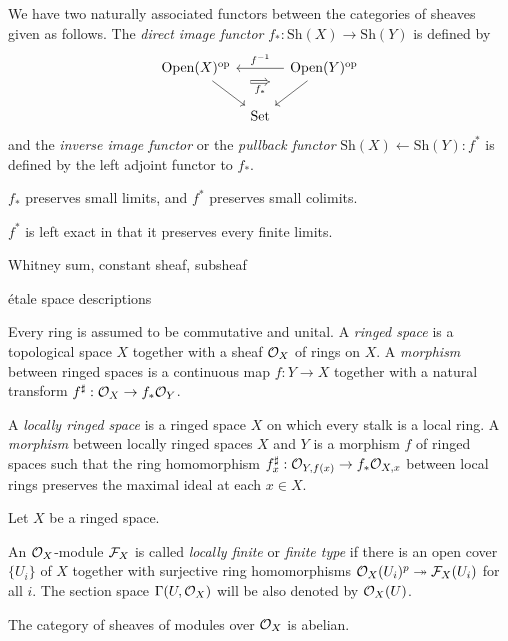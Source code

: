 \documentclass{../../large}
\newcommand{\Sh}{\mathrm{Sh}}
\newcommand{\Open}{\mathrm{Open}}
\begin{document}
\begin{prb}
We have two naturally associated functors between the categories of sheaves given as follows.
The \emph{direct image functor} $f_*:\Sh(X)\to\Sh(Y)$ is defined by
\[\begin{tikzcd}[column sep=tiny]
\Open(X)^\op \ar{dr}
\ar[Rightarrow, shorten >=10, shorten <=10, shift right=4, swap]{rr}{f_*}
&& \Open(Y)^\op \ar[swap]{ll}{f^{-1}}\ar{dl}\\
&\mathrm{Set}
\end{tikzcd}\]
and the \emph{inverse image functor} or the \emph{pullback functor} $\Sh(X)\leftarrow\Sh(Y):f^*$ is defined by the left adjoint functor to $f_*$.

\begin{parts}
\item $f_*$ preserves small limits, and $f^*$ preserves small colimits.
\item $f^*$ is left exact in that it preserves every finite limits.
\end{parts}
\end{prb}


\begin{prb}
Whitney sum, constant sheaf, subsheaf

\'etale space descriptions
\begin{parts}
\item
\end{parts}
\end{prb}


\begin{prb}
Every ring is assumed to be commutative and unital.
A \emph{ringed space} is a topological space $X$ together with a sheaf $\mathcal{O}_X$ of rings on $X$.
A \emph{morphism} between ringed spaces is a continuous map $f:Y\to X$ together with a natural transform $f^\sharp:\mathcal{O}_X\to f_*\mathcal{O}_Y$.

A \emph{locally ringed space} is a ringed space $X$ on which every stalk is a local ring.
A \emph{morphism} between locally ringed spaces $X$ and $Y$ is a morphism $f$ of ringed spaces such that the ring homomorphism $f^\sharp_x:\mathcal{O}_{Y,f(x)}\to f_*\mathcal{O}_{X,x}$ between local rings preserves the maximal ideal at each $x\in X$.

\end{prb}

\begin{prb}
Let $X$ be a ringed space.

An $\mathcal{O}_X$-module $\mathcal{F}_X$ is called \emph{locally finite} or \emph{finite type} if there is an open cover $\{U_i\}$ of $X$ together with surjective ring homomorphisms $\mathcal{O}_X(U_i)^p\twoheadrightarrow\mathcal{F}_X(U_i)$ for all $i$.
The section space $\Gamma(U,\mathcal{O}_X)$ will be also denoted by $\mathcal{O}_X(U)$.
\begin{parts}
\item The category of sheaves of modules over $\mathcal{O}_X$ is abelian.
\end{parts}
\end{prb}
\end{document}
